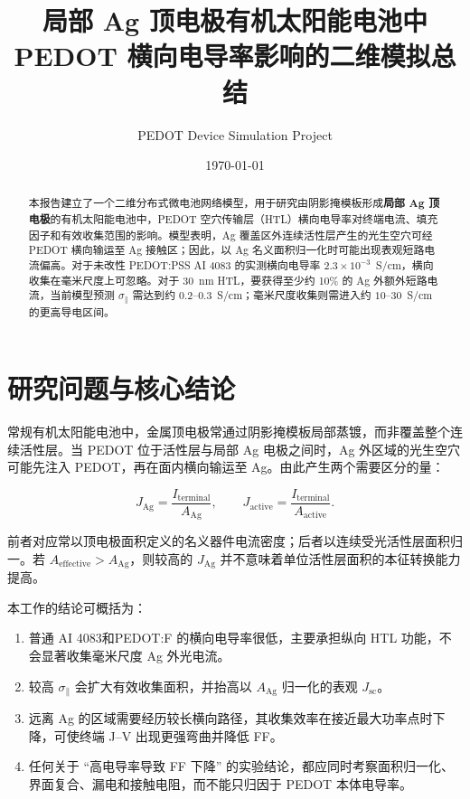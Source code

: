 \documentclass[UTF8,a4paper,11pt]{ctexart}
\title{局部 Ag 顶电极有机太阳能电池中\\PEDOT 横向电导率影响的二维模拟总结}
\author{PEDOT Device Simulation Project}
\date{\today}
\newcommand{\sigpar}{\sigma_{\parallel}}
\newcommand{\Aag}{A_{\mathrm{Ag}}}
\newcommand{\Aactive}{A_{\mathrm{active}}}
\newcommand{\Aeff}{A_{\mathrm{effective}}}
\begin{document}
\maketitle

\begin{abstract}
本报告建立了一个二维分布式微电池网络模型，用于研究由阴影掩模板形成\textbf{局部 Ag 顶电极}的有机太阳能电池中，PEDOT 空穴传输层（HTL）横向电导率对终端电流、填充因子和有效收集范围的影响。模型表明，Ag 覆盖区外连续活性层产生的光生空穴可经 PEDOT 横向输运至 Ag 接触区；因此，以 Ag 名义面积归一化时可能出现表观短路电流偏高。对于未改性 PEDOT:PSS AI 4083 的实测横向电导率 $2.3\times10^{-3}$~S/cm，横向收集在毫米尺度上可忽略。对于 30~nm HTL，要获得至少约 10\% 的 Ag 外额外短路电流，当前模型预测 $\sigpar$ 需达到约 $0.2$--$0.3$~S/cm；毫米尺度收集则需进入约 $10$--$30$~S/cm 的更高导电区间。
\end{abstract}

\tableofcontents
\newpage

\section{研究问题与核心结论}

常规有机太阳能电池中，金属顶电极常通过阴影掩模板局部蒸镀，而非覆盖整个连续活性层。当 PEDOT 位于活性层与局部 Ag 电极之间时，Ag 外区域的光生空穴可能先注入 PEDOT，再在面内横向输运至 Ag。由此产生两个需要区分的量：

\begin{equation}
J_{\mathrm{Ag}}=\frac{I_{\mathrm{terminal}}}{\Aag},\qquad
J_{\mathrm{active}}=\frac{I_{\mathrm{terminal}}}{\Aactive}.
\end{equation}

前者对应常以顶电极面积定义的名义器件电流密度；后者以连续受光活性层面积归一。若 $\Aeff>\Aag$，则较高的 $J_{\mathrm{Ag}}$ 并不意味着单位活性层面积的本征转换能力提高。

本工作的结论可概括为：

\begin{enumerate}[label=\arabic*.]
  \item 普通 AI 4083和PEDOT:F 的横向电导率很低，主要承担纵向 HTL 功能，不会显著收集毫米尺度 Ag 外光电流。
  \item 较高 $\sigpar$ 会扩大有效收集面积，并抬高以 $\Aag$ 归一化的表观 $J_{\mathrm{sc}}$。
  \item 远离 Ag 的区域需要经历较长横向路径，其收集效率在接近最大功率点时下降，可使终端 J--V 出现更强弯曲并降低 FF。
  \item 任何关于 ``高电导率导致 FF 下降'' 的实验结论，都应同时考察面积归一化、界面复合、漏电和接触电阻，而不能只归因于 PEDOT 本体电导率。
\end{enumerate}
\end{document}
